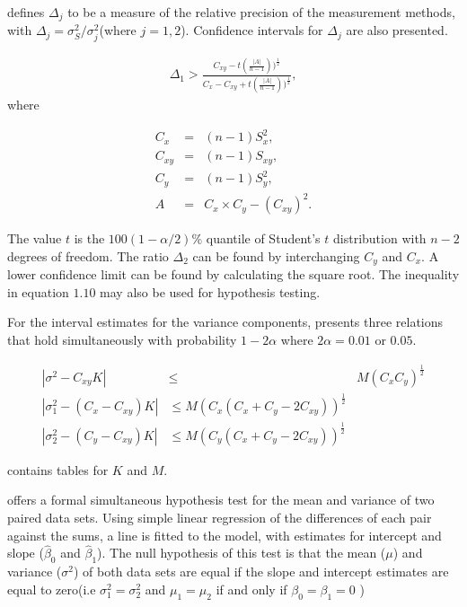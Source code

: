 \documentclass[12pt, a4paper]{article}
\begin{document}
\citet{Thompson} defines $\Delta_{j}$ to be a measure of the
relative precision of the measurement methods, with $\Delta_{j}=
\sigma^2_{S}/\sigma^2_{j}$(where $j=1,2$). Confidence intervals
for $\Delta_{j}$ are also presented.

\begin{eqnarray}
\Delta_{1} > \frac{C_{xy}-
t(\frac{|A|}{n-1}))^{\frac{1}{2}}}{C_{x}-C_{xy}+
t(\frac{|A|}{n-1}))^{\frac{1}{2}}},
\end{eqnarray}
where

\begin{eqnarray}
C_{x}&=&(n-1)S^2_{x},\nonumber\\
C_{xy}&=&(n-1)S_{xy},\nonumber\\
C_{y}&=&(n-1)S^2_{y},\nonumber\\
A &=& C_{x}\times C_{y} - (C_{xy})^2 . \nonumber
\end{eqnarray}

The value $t$ is the $100(1-\alpha/2)\%$ quantile of Student's $t$
distribution with $n-2$ degrees of freedom. The ratio $\Delta_{2}$
can be found by interchanging $C_{y}$ and $C_{x}$. A lower
confidence limit can be found by calculating the square root. The
inequality in equation $1.10$ may also be used for hypothesis
testing.

For the interval estimates for the variance components,
\citet{Thompson} presents three relations that hold simultaneously
with probability $1-2\alpha$ where $2\alpha=0.01$ or $0.05$.


\begin{eqnarray*}
|\sigma^2-C_{xy}K| &\leqslant& M(C_{x}C_{y})^{\frac{1}{2}}\\
|\sigma^2_{1}-(C_{x}-C_{xy})K|&\leqslant M(C_{x}(C_{x}+C_{y}-2C_{xy}))^{\frac{1}{2}}\nonumber\\
|\sigma^2_{2}-(C_{y}-C_{xy})K|&\leqslant
M(C_{y}(C_{x}+C_{y}-2C_{xy}))^{\frac{1}{2}}\nonumber
\end{eqnarray*}

\citet{Thompson} contains tables for $K$ and $M$.

\citet{BB89} offers a formal simultaneous hypothesis test for the
mean and variance of two paired data sets. Using simple linear
regression of the differences of each pair against the sums, a
line is fitted to the model, with estimates for intercept and
slope ($\hat{\beta}_{0}$ and $\hat{\beta}_{1}$). The null
hypothesis of this test is that the mean ($\mu$) and variance
($\sigma^{2}$) of both data sets are equal if the slope and
intercept estimates are equal to zero(i.e $\sigma^{2}_{1} =
\sigma^{2}_{2}$ and $\mu_{1}=\mu_{2}$ if and only if $\beta_{0}=
\beta_{1}=0$ )
\end{document}
